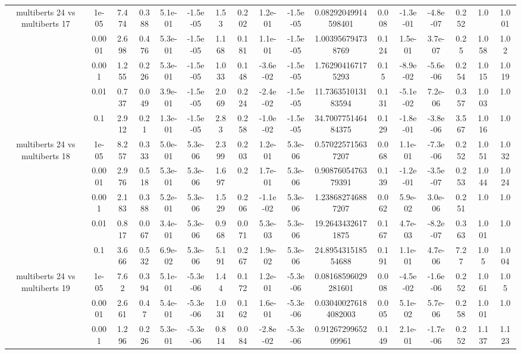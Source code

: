 \begin{tabular}{|c|c|c|c|c|c|c|c|c|c|c|c|c|c|c|c|c|}
\hline
\multirow{5}{*}{multiberts 24 vs multiberts 17} & 1e-05 & 7.474 & 0.388 & 5.1e-01 & -1.5e-05 & 1.53 & 0.202 & 1.2e-01 & -1.5e-05 & 0.08292049914598401 & 0.008 & -1.3e-01 & -4.8e-07 & 0.252 & 1.0 & 1.001 \\
 & 0.0001 & 2.698 & 0.476 & 5.3e-01 & -1.5e-05 & 1.168 & 0.181 & 1.1e-01 & -1.5e-05 & 1.003956794738769 & 0.124 & 1.5e-01 & 3.7e-07 & 0.25 & 1.058 & 1.02 \\
 & 0.001 & 1.255 & 0.226 & 5.3e-01 & -1.5e-05 & 1.033 & 0.148 & -3.6e-02 & -1.5e-05 & 1.762904167175293 & 0.15 & -8.9e-02 & -5.6e-06 & 0.254 & 1.015 & 1.019 \\
 & 0.01 & 0.737 & 0.049 & 3.9e-01 & -1.5e-05 & 2.069 & 0.224 & -2.4e-02 & -1.5e-05 & 11.736351013183594 & 0.131 & -5.1e-02 & 7.2e-06 & 0.357 & 1.003 & 1.0 \\
 & 0.1 & 2.912 & 0.21 & 1.3e-01 & -1.5e-05 & 2.83 & 0.258 & -1.0e-02 & -1.5e-05 & 34.700775146484375 & 0.129 & -1.8e-01 & -3.8e-06 & 3.567 & 1.016 & 1.0 \\
\hline
\multirow{5}{*}{multiberts 24 vs multiberts 18} & 1e-05 & 8.257 & 0.333 & 5.0e-01 & 5.3e-06 & 2.399 & 0.203 & 1.2e-01 & 5.3e-06 & 0.570225715637207 & 0.068 & 1.1e-01 & -7.3e-06 & 0.252 & 1.051 & 1.032 \\
 & 0.0001 & 2.976 & 0.518 & 5.3e-01 & 5.3e-06 & 1.697 & 0.2 & 1.7e-01 & 5.3e-06 & 0.9087605476379391 & 0.139 & -1.2e-01 & -3.5e-07 & 0.253 & 1.044 & 1.024 \\
 & 0.001 & 2.183 & 0.388 & 5.2e-01 & 5.3e-06 & 1.529 & 0.206 & -1.1e-02 & 5.3e-06 & 1.238682746887207 & 0.062 & 5.9e-02 & 3.0e-06 & 0.251 & 1.0 & 1.0 \\
 & 0.01 & 0.817 & 0.067 & 3.4e-01 & 5.3e-06 & 0.968 & 0.071 & 5.3e-03 & 5.3e-06 & 19.26434326171875 & 0.167 & 4.7e-03 & -8.2e-07 & 0.363 & 1.001 & 1.0 \\
 & 0.1 & 3.666 & 0.532 & 6.9e-02 & 5.3e-06 & 5.191 & 0.267 & 1.9e-02 & 5.3e-06 & 24.895431518554688 & 0.191 & 1.1e-01 & 4.7e-06 & 7.27 & 1.05 & 1.004 \\
\hline
\multirow{5}{*}{multiberts 24 vs multiberts 19} & 1e-05 & 7.62 & 0.394 & 5.1e-01 & -5.3e-06 & 1.44 & 0.172 & 1.2e-01 & -5.3e-06 & 0.08168596029281601 & 0.008 & -4.5e-02 & -1.6e-06 & 0.252 & 1.061 & 1.05 \\
 & 0.0001 & 2.661 & 0.47 & 5.4e-01 & -5.3e-06 & 1.031 & 0.162 & 1.6e-01 & -5.3e-06 & 0.030400276184082003 & 0.005 & 5.1e-02 & 5.7e-06 & 0.258 & 1.001 & 1.0 \\
 & 0.001 & 1.296 & 0.226 & 5.3e-01 & -5.3e-06 & 0.814 & 0.084 & -2.8e-02 & -5.3e-06 & 0.9126729965209961 & 0.149 & 2.1e-01 & -1.7e-06 & 0.252 & 1.137 & 1.123 \\

\end{tabular}
